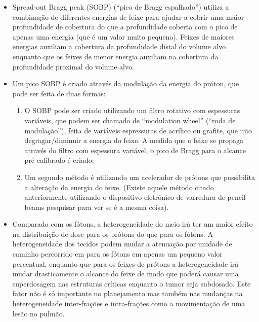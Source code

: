 \documentclass[11pt,a4paper]{article}
\newcounter{exemplo}
\begin{document}
\begin{exemplo}
\begin{itemize}
        \item Spread-out Bragg peak (SOBP) (``pico de Bragg espalhado'') utiliza a combinação de diferentes energias de feixe para ajudar a cobrir uma maior profundidade de cobertura do que a profundidade coberta com o pico de apenas uma energia (que é um valor muito pequeno). Feixes de maiores  energias auxiliam a cobertura da profundidade distal do volume alvo enquanto que os feixes de menor energia auxiliam na cobertura da profundidade proximal do volume alvo.
        
        \item Um pico SOBP é criado através da modulação da energia do próton, que pode ser feita de duas formas:
            \begin{enumerate}[label=\textcolor{CarnationPink}{\roman*.}]
                \item O SOBP pode ser criado utilizando um filtro rotativo com espessuras variáveis, que podem ser chamado de ``modulation wheel'' (``roda de modulação''), feita de variáveis espressuras de acrílico ou grafite, que irão degragar/diminuir a energia do feixe. A medida que o feixe se propaga através do filtro com espessura variável, o pico de Bragg para o alcance pré-calibrado é criado;
                
                \item Um segundo método é utilizando um acelerador de prótons que possibilita a alteração da energia do feixe. (Existe aquele método citado anteriormente utilizando o dispositivo eletrônico de varredura de pencil-beams pesquisar para ver se é a mesma coisa).
            \end{enumerate}

        \item Comparado com os fótons, a heterogeneidade do meio irá ter um maior efeito na distribuição de dose para os prótons do que para os fótons. A heterogeneidade dos tecidos podem mudar a atenuação por unidade de caminho percorrido em para os fótons em apenas um pequeno valor percentual, enquanto que para os feixes de prótons a heterogeneidade irá mudar drasticamente o alcance do feixe de modo que  poderá causar uma superdosagem nas estruturas críticas enquanto o tumor seja subdosado. Este fator não é só importante no planejamento mas também nas mudanças na heterogeneidade inter-frações e intra-frações como a movimentação de uma lesão no pulmão.
        

\end{itemize}
\end{exemplo}
\end{document}
